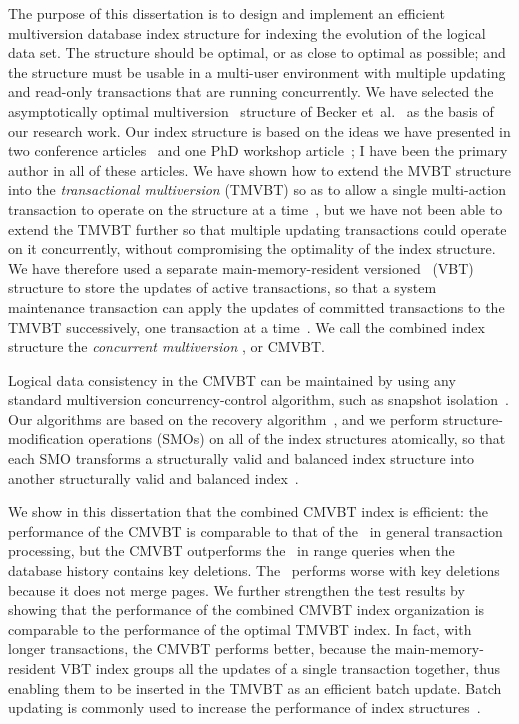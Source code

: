 The purpose of this dissertation is to design and implement an efficient
multiversion database index structure for indexing the evolution of the 
logical data set. 
The structure should be optimal, or as close to optimal as possible; and the
structure must be usable in a multi-user environment with multiple updating
and read-only transactions that are running concurrently.
We have selected the asymptotically optimal multiversion \Btree\ structure of
Becker et~al.~\cite{becker:1993:optimal,becker:1996:mvbt} as the basis of our
research work. 
Our index structure is based on the ideas we have presented in two
conference articles~\cite{haapasalo:2009:tmvbt,haapasalo:2009:cmvbt}
and one PhD workshop article~\cite{haapasalo:2008:concurrency}; 
I have been the primary author in all of these articles.
We have shown how to extend the MVBT structure into the \emph{transactional
multiversion \Btree} (TMVBT) so as to allow a single multi-action transaction
to operate on the structure at a time~\cite{haapasalo:2009:tmvbt}, but 
we have not been able to extend the TMVBT further so that multiple updating
transactions could operate on it concurrently, without compromising the
optimality of the index structure.
We have therefore used a separate main-memory-resident versioned \Btree\
(VBT) structure to store the updates of active transactions, so that a system
maintenance transaction can apply the updates of committed transactions to
the TMVBT successively, one transaction at a
time~\cite{haapasalo:2009:cmvbt}.
We call the combined index structure the \emph{concurrent multiversion
\Btree}, or CMVBT\@.

Logical data consistency in the CMVBT can be maintained by using any standard
multiversion concurrency-control algorithm, such as snapshot
isolation~\cite{berenson:1995:sql-critique,fekete:2005:snapshot-isolation,cahill:2008:snapshot}.
Our algorithms are based on the \abbr{ARIES} recovery
algorithm~\cite{mohan:1992:aries,mohan:1990:aries-kvl}, and we perform
structure-modification operations (SMOs) on all of the index
structures atomically, so that each SMO transforms a structurally valid and
balanced index structure into another structurally valid and balanced
index~\cite{jaluta:2003:recoverable,jaluta:2005:blink,jaluta:2006:page-server}.

We show in this dissertation that the combined CMVBT index is efficient:
the performance of the CMVBT is comparable to that of the \TSBtree\ in
general transaction processing, but the CMVBT outperforms the \TSBtree\ in
range queries when the database history contains key deletions.
The \TSBtree\ performs worse with key deletions because it does not merge
pages.
We further strengthen the test results by showing that the performance of the
combined CMVBT index organization is comparable to the performance of the
optimal TMVBT index.
In fact, with longer transactions, the CMVBT performs better, because the
main-memory-resident VBT index groups all the updates of a single transaction
together, thus enabling them to be inserted in the TMVBT as an efficient
batch update. 
Batch updating is commonly used to increase the performance of index
structures~\cite{pollari-malmi:1996:batch-updates,pollari-malmi:2000:differential-index}.

